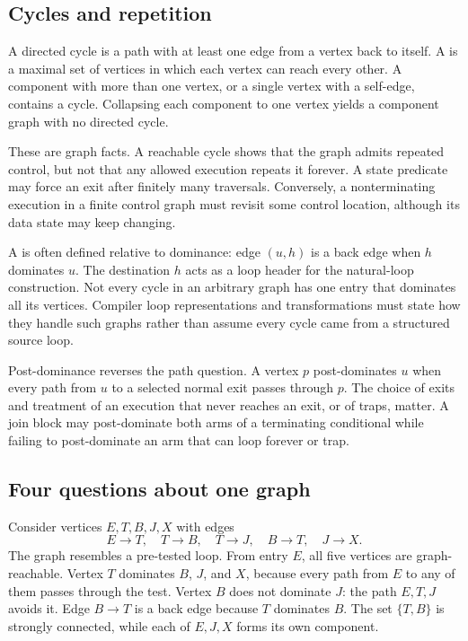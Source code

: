 \subsection{Cycles and repetition}

A directed cycle is a path with at least one edge from a vertex back to itself. A
 is a maximal set of vertices in which
each vertex can reach every other. A component with more than one vertex, or a
single vertex with a self-edge, contains a cycle. Collapsing each component to
one vertex yields a component graph with no directed cycle.

These are graph facts. A reachable cycle shows that the graph admits repeated
control, but not that any allowed execution repeats it forever. A state
predicate may force an exit after finitely many traversals. Conversely, a
nonterminating execution in a finite control graph must revisit some control
location, although its data state may keep changing.

A  is often defined relative to dominance: edge
\((u,h)\) is a back edge when \(h\) dominates \(u\). The destination \(h\)
acts as a loop header for the natural-loop construction. Not every cycle in
an arbitrary graph has one entry that dominates all its vertices. Compiler
loop representations and transformations must state how they handle such
graphs rather than assume every cycle came from a structured source loop.

Post-dominance reverses the path question. A vertex \(p\) post-dominates
\(u\) when every path from \(u\) to a selected normal exit passes through
\(p\). The choice of exits and treatment of an execution that never reaches
an exit, or of traps, matter. A
join block may post-dominate both arms of a terminating conditional while
failing to post-dominate an arm that can loop forever or trap.

\subsection{Four questions about one graph}

Consider vertices \(E,T,B,J,X\) with edges
\[
 E\to T,\quad T\to B,\quad T\to J,\quad
 B\to T,\quad J\to X.
\]
The graph resembles a pre-tested loop. From entry \(E\), all five vertices are
graph-reachable. Vertex \(T\) dominates \(B\), \(J\), and \(X\), because
every path from \(E\) to any of them passes through the test. Vertex \(B\)
does not dominate \(J\): the path \(E,T,J\) avoids it. Edge \(B\to T\) is a
back edge because \(T\) dominates \(B\). The set \(\{T,B\}\) is strongly
connected, while each of \(E,J,X\) forms its own component.


